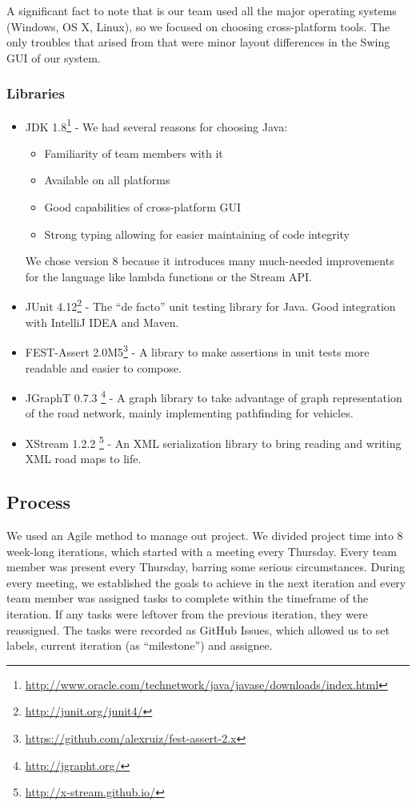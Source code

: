 \documentclass[a4paper,12pt]{article}
\begin{document}
A significant fact to note that is our team used all the major operating systems (Windows, OS X, Linux), so we focused on choosing cross-platform tools. The only troubles that arised from that were minor layout differences in the Swing GUI of our system.

\subsubsection*{Libraries}

\begin{itemize}
	\item JDK 1.8\footnote{\url{http://www.oracle.com/technetwork/java/javase/downloads/index.html}} - We had several reasons for choosing Java: \begin{itemize}
		\item Familiarity of team members with it
		\item Available on all platforms
		\item Good capabilities of cross-platform GUI
		\item Strong typing allowing for easier maintaining of code integrity
	\end{itemize}
	We chose version 8 because it introduces many much-needed improvements for the language like lambda functions or the Stream API.
	\item JUnit 4.12\footnote{\url{http://junit.org/junit4/}} - The ``de facto'' unit testing library for Java. Good integration with IntelliJ IDEA and Maven.
	\item FEST-Assert 2.0M5\footnote{\url{https://github.com/alexruiz/fest-assert-2.x}} - A library to make assertions in unit tests more readable and easier to compose.
	\item JGraphT 0.7.3 \footnote{\url{http://jgrapht.org/}} - A graph library to take advantage of graph representation of the road network, mainly implementing pathfinding for vehicles.
	\item XStream 1.2.2 \footnote{\url{http://x-stream.github.io/}} - An XML serialization library to bring reading and writing XML road maps to life.
\end{itemize}

\subsection{Process}
We used an Agile method to manage out project. We divided project time into 8 week-long iterations, which started with a meeting every Thursday. Every team member was present every Thursday, barring some serious circumstances. During every meeting, we established the goals to achieve in the next iteration and every team member was assigned tasks to complete within the timeframe of the iteration. If any tasks were leftover from the previous iteration, they were reassigned. The tasks were recorded as GitHub Issues, which allowed us to set labels, current iteration (as ``milestone'') and assignee.
\end{document}
